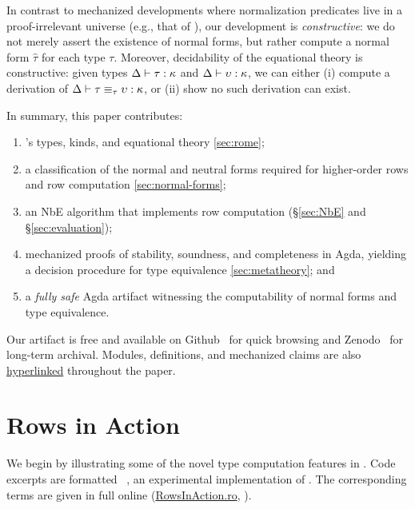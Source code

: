 \documentclass[sigplan,screen]{acmart}
\newif\ifrowsInAction\rowsInActiontrue
\begin{document}
In contrast to mechanized developments where normalization predicates live in a proof-irrelevant universe (e.g., that of \citet{TooheyCJX26}), our development is \emph{constructive}: we do not merely assert the existence of normal forms, but rather compute a normal form $\hat{\tau}$ for each type $\tau$. Moreover, decidability of the equational theory is constructive: given types $\Delta \vdash \tau : \kappa$ and $\Delta \vdash \upsilon : \kappa$, we can either (i) compute a derivation of $\Delta \vdash \tau \equiv_{\tau} \upsilon : \kappa$, or (ii) show no such derivation can exist.   


In summary, this paper contributes: 

\begin{enumerate}
  \item \Rome{}'s types, kinds, and equational theory \cref{sec:rome};
  \item a classification of the normal and neutral forms required for higher-order rows and row computation \cref{sec:normal-forms};
  \item an NbE algorithm that implements row computation (\S\ref{sec:NbE} and \S\ref{sec:evaluation});  
  \item mechanized proofs of stability, soundness, and completeness in Agda, yielding a decision procedure for \Rome{} type equivalence \cref{sec:metatheory}; and
  \item a \emph{fully safe} Agda artifact witnessing the computability of normal forms and type equivalence.
\end{enumerate}

Our artifact is free and available on Github~\citep{GithubArtifact} for quick browsing and Zenodo~\citep{Artifact} for long-term archival. Modules, definitions, and mechanized claims are also \href{\DocBase}{hyperlinked} throughout the paper.
\fi 


\section{Rows in Action}
\label{sec:rows-in-action}
\ifrowsInAction

We begin by illustrating some of the novel type computation features in \Rome. Code excerpts are formatted \ala{} \Rosi~\citep{Rosi}, an experimental implementation of \Rome. The corresponding \Rosi{} terms are given in full online (\href{\RosiCode}{RowsInAction.ro}, \citep{GithubArtifact}).
\end{document}
